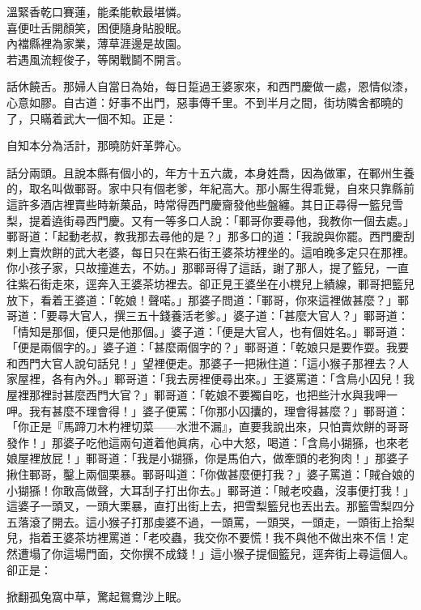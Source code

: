 \begin{myquote} 
溫緊香乾口賽蓮，能柔能軟最堪憐。\\喜便吐舌開顏笑，困便隨身貼股眠。\\內襠縣裡為家業，薄草涯邊是故園。\\若遇風流輕俊子，等閑戰鬬不開言。
\end{myquote} 

話休饒舌。那婦人自當日為始，每日踅過王婆家來，和西門慶做一處，恩情似漆，心意如膠。自古道：好事不出門，惡事傳千里。不到半月之間，街坊隣舍都曉的了，只瞞着武大一個不知。正是：

\begin{myquote} 
自知本分為活計，那曉防奸革弊心。
\end{myquote} 

話分兩頭。且說本縣有個小的，年方十五六歲，本身姓喬，因為做軍，在鄆州生養的，取名叫做鄆哥。家中只有個老爹，年紀高大。那小厮生得乖覺，自來只靠縣前這許多酒店裡賣些時新菓品，時常得西門慶齎發他些盤纏。{}其日正尋得一籃兒雪梨，提着遶街尋西門慶。又有一等多口人說：「鄆哥你要尋他，我教你一個去處。」鄆哥道：「起動老叔，教我那去尋他的是？」那多口的道：「我說與你罷。西門慶刮剌上賣炊餅的武大老婆，每日只在紫石街王婆茶坊裡坐的。這咱晚多定只在那裡。你小孩子家，只故撞進去，不妨。」那鄆哥得了這話，謝了那人，提了籃兒，一直往紫石街走來，逕奔入王婆茶坊裡去。卻正見王婆坐在小櫈兒上績線，鄆哥把籃兒放下，看着王婆道：「乾娘！聲喏。」那婆子問道：「鄆哥，你來這裡做甚麼？」鄆哥道：「要尋大官人，撰三五十錢養活老爹。」婆子道：「甚麼大官人？」鄆哥道：「情知是那個，便只是他那個。」{}婆子道：「便是大官人，也有個姓名。」鄆哥道：「便是兩個字的。」婆子道：「甚麼兩個字的？」鄆哥道：「乾娘只是要作耍。我要和西門大官人說句話兒！」望裡便走。那婆子一把揪住道：「這小猴子那裡去？人家屋裡，各有內外。」鄆哥道：「我去房裡便尋出來。」王婆罵道：「含鳥小囚兒！我屋裡那裡討甚麼西門大官？」鄆哥道：「乾娘不要獨自吃，也把些汁水與我呷一呷。{}我有甚麼不理會得！」婆子便罵：「你那小囚攮的，理會得甚麼？」鄆哥道：「你正是『馬蹄刀木杓裡切菜——水泄不漏』，直要我說出來，只怕賣炊餅的哥哥發作！」{}那婆子吃他這兩句道着他眞病，心中大怒，喝道：「含鳥小猢猻，也來老娘屋裡放屁！」鄆哥道：「我是小猢猻，你是馬伯六，做牽頭的老狗肉！」{}那婆子揪住鄆哥，鑿上兩個栗暴。鄆哥叫道：「你做甚麼便打我？」婆子罵道：「賊㒲娘的小猢猻！你敢高做聲，大耳刮子打出你去。」鄆哥道：「賊老咬蟲，沒事便打我！」這婆子一頭叉，一頭大栗暴，直打出街上去，把雪梨籃兒也丟出去。那籃雪梨四分五落滾了開去。這小猴子打那虔婆不過，一頭罵，一頭哭，一頭走，一頭街上拾梨兒，{}指着王婆茶坊裡罵道：「老咬蟲，我交你不要慌！我不與他不做出來不信！定然遭塌了你這場門面，交你撰不成錢！」這小猴子提個籃兒，逕奔街上尋這個人。卻正是：

\begin{myquote} 
掀翻孤兔窩中草，驚起鴛鴦沙上眠。{}
\end{myquote} 


